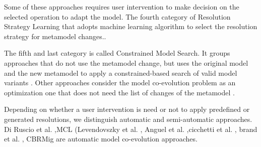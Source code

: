  
  Some of these approaches requires user intervention to make decision on the selected operation to adapt the model.
  The fourth category of Resolution Strategy Learning that adopts machine learning algorithm to select the resolution strategy for metamodel changes.\cite{anguel2013towards}.%
 
The fifth and last category is called Constrained Model Search. It groups approaches that do not use the metamodel change, but uses the original model and the new metamodel to apply a constrained-based search of valid model variants \cite{demuth2016co,gomez2014approach,schonbock2014care}. Other approaches consider the model co-evolution problem as an optimization one that does not need the list of changes of the metamodel \cite{kessentini2016automated,kessentini2019automated,kessentini2020interactive}.




Depending on whether a user intervention is need or not to apply predefined or generated resolutions, we distinguish automatic and semi-automatic approaches.
Di Ruscio et al. \cite{10.1007/978-3-642-33654-62},MCL (Levendovszky et al. \cite{levendovszky2014semi}, Anguel et al. \cite{anguel2014using},cicchetti et al. \cite{cicchetti2008automating}, brand et al. \cite{van2011generic}, CBRMig\cite{anguel2013towards} are automatic model co-evolution approaches.

